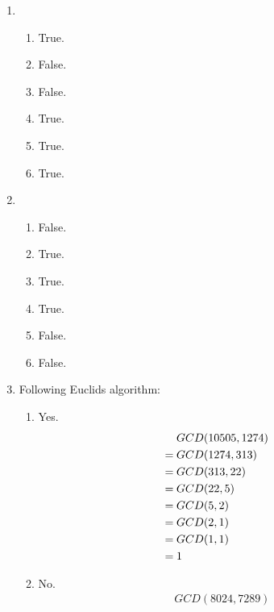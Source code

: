 \documentclass[11pt]{article}
\begin{document}
\begin{enumerate}[7.1]
  \item
  \begin{enumerate}
    \item True.
    \item False.
    \item False.
    \item True.
    \item True.
    \item True.
  \end{enumerate}
  \item
  \begin{enumerate}
    \item False.
    \item True.
    \item True.
    \item True.
    \item False.
    \item False.
  \end{enumerate}
  \item Following Euclids algorithm:
  \begin{enumerate}
  \item Yes.
    \begin{align*}
                                    & GCD(10505, 1274) & \\
      =\hspace{0.25em} & GCD(1274, 313)     & \\
      =\hspace{0.25em} & GCD(313, 22)         & \\
      =\hspace{0.25em} & GCD(22, 5)             & \\
      =\hspace{0.25em} & GCD(5, 2)               & \\
      =\hspace{0.25em} & GCD(2, 1 )              & \\
      =\hspace{0.25em} & GCD(1, 1)               & \\
      =\hspace{0.25em} & 1                             & \\  
    \end{align*}
  \item No.
    \begin{align*}
                                    & GCD(8024, 7289) & \\

\end{align*}
\end{enumerate}
\end{enumerate}
\end{document}
